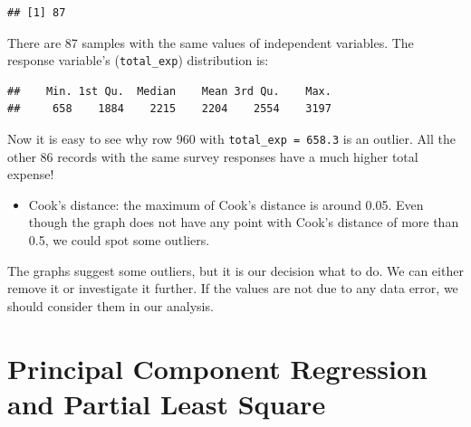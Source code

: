 \documentclass[12pt,]{krantz}
\makeatletter
\newenvironment{Shaded}{\begin{snugshade}}{\end{snugshade}}
\newcommand{\KeywordTok}[1]{\textcolor[rgb]{0.27,0.27,0.27}{\textbf{#1}}}
\newcommand{\NormalTok}[1]{#1}
\newcommand{\OperatorTok}[1]{\textcolor[rgb]{0.43,0.43,0.43}{\textbf{#1}}}
\providecommand{\tightlist}{%
  \setlength{\itemsep}{0pt}\setlength{\parskip}{0pt}}
\newenvironment{kframe}{%
\medskip{}
\setlength{\fboxsep}{.8em}
 \def\at@end@of@kframe{}%
 \ifinner\ifhmode%
  \def\at@end@of@kframe{\end{minipage}}%
  \begin{minipage}{\columnwidth}%
 \fi\fi%
 \def\FrameCommand##1{\hskip\@totalleftmargin \hskip-\fboxsep
 \colorbox{shadecolor}{##1}\hskip-\fboxsep
     \hskip-\linewidth \hskip-\@totalleftmargin \hskip\columnwidth}%
 \MakeFramed {\advance\hsize-\width
   \@totalleftmargin\z@ \linewidth\hsize
   \@setminipage}}%
 {\par\unskip\endMakeFramed%
 \at@end@of@kframe}
\renewenvironment{Shaded}{\begin{kframe}}{\end{kframe}}
\makeatother
\begin{document}
\begin{verbatim}
## [1] 87
\end{verbatim}

There are 87 samples with the same values of independent variables. The response variable's (\texttt{total\_exp}) distribution is:

\begin{Shaded}
\end{Shaded}

\begin{verbatim}
##    Min. 1st Qu.  Median    Mean 3rd Qu.    Max. 
##     658    1884    2215    2204    2554    3197
\end{verbatim}

Now it is easy to see why row 960 with \texttt{total\_exp\ =\ 658.3} is an outlier. All the other 86 records with the same survey responses have a much higher total expense!

\begin{itemize}
\tightlist
\item
  Cook's distance: the maximum of Cook's distance is around 0.05. Even though the graph does not have any point with Cook's distance of more than 0.5, we could spot some outliers.
\end{itemize}

The graphs suggest some outliers, but it is our decision what to do. We can either remove it or investigate it further. If the values are not due to any data error, we should consider them in our analysis.

\hypertarget{principal-component-regression-and-partial-least-square}{%
\section{Principal Component Regression and Partial Least Square}\label{principal-component-regression-and-partial-least-square}}
\end{document}
